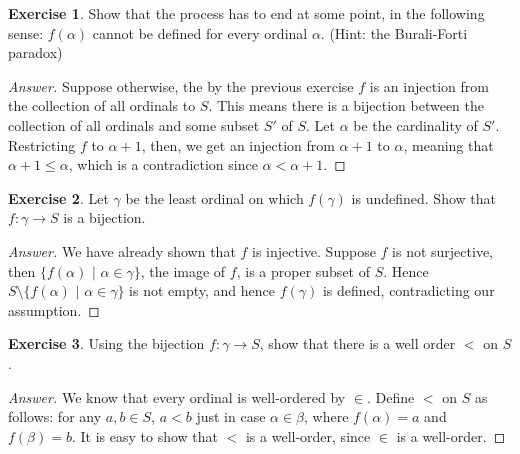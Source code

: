 \documentclass[11pt]{article}
\theoremstyle{definition}
\newtheorem{exer}{Exercise}
\begin{document}
\begin{exer}
Show that the process has to end at some point, in the following sense: $f(\alpha)$ cannot be defined for every ordinal $\alpha$. (Hint: the Burali-Forti paradox)
\end{exer}

\begin{proof}[Answer]
Suppose otherwise, the by the previous exercise $f$ is an injection from the collection of all ordinals to $S$. This means there is a bijection between the collection of all ordinals and some subset $S'$ of $S$. Let $\alpha$ be the cardinality of $S'$. Restricting $f$ to $\alpha +1$, then, we get an injection from $\alpha +1$ to $\alpha$, meaning that $\alpha +1 \leqslant \alpha$, which is a contradiction since $\alpha < \alpha +1$.

\end{proof}

\begin{exer}
Let $\gamma$ be the least ordinal on which $f(\gamma)$ is undefined. Show that $f: \gamma \rightarrow S$ is a bijection.
\end{exer}

\begin{proof}[Answer]
We have already shown that $f$ is injective. Suppose $f$ is not surjective, then $\{f(\alpha) \, \, | \, \, \alpha \in \gamma\}$, the image of $f$, is a proper subset of $S$. Hence $S \setminus \{f(\alpha) \, \, | \, \, \alpha \in \gamma\}$ is not empty, and hence $f(\gamma)$ is defined, contradicting our assumption.

\end{proof}

\begin{exer}
Using the bijection $f: \gamma \rightarrow S$, show that there is a well order $<$ on $S$.
\end{exer}

\begin{proof}[Answer]
We know that every ordinal is well-ordered by $\in$. Define $<$ on $S$ as follows: for any $a, b \in S$, $a < b$ just in case $\alpha \in \beta$, where $f(\alpha) = a$ and $f(\beta) = b$. It is easy to show that $<$ is a well-order, since $\in$ is a well-order.

\end{proof}
\end{document}
